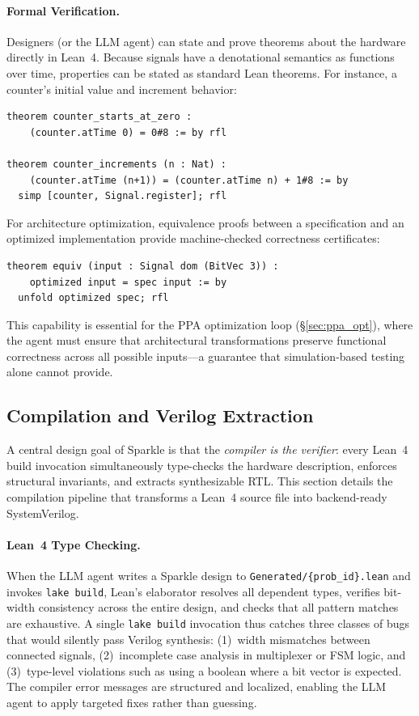 \paragraph{Formal Verification.}
Designers (or the LLM agent) can state and prove theorems about the hardware directly in Lean~4. Because signals have a denotational semantics as functions over time, properties can be stated as standard Lean theorems. For instance, a counter's initial value and increment behavior:
\begin{small}
\begin{verbatim}
theorem counter_starts_at_zero :
    (counter.atTime 0) = 0#8 := by rfl

theorem counter_increments (n : Nat) :
    (counter.atTime (n+1)) = (counter.atTime n) + 1#8 := by
  simp [counter, Signal.register]; rfl
\end{verbatim}
\end{small}
For architecture optimization, equivalence proofs between a specification and an optimized implementation provide machine-checked correctness certificates:
\begin{small}
\begin{verbatim}
theorem equiv (input : Signal dom (BitVec 3)) :
    optimized input = spec input := by
  unfold optimized spec; rfl
\end{verbatim}
\end{small}
This capability is essential for the PPA optimization loop (\S\ref{sec:ppa_opt}), where the agent must ensure that architectural transformations preserve functional correctness across all possible inputs---a guarantee that simulation-based testing alone cannot provide.

\subsection{Compilation and Verilog Extraction}
\label{sec:compilation}

A central design goal of Sparkle is that the \emph{compiler is the verifier}: every Lean~4 build invocation simultaneously type-checks the hardware description, enforces structural invariants, and extracts synthesizable RTL. This section details the compilation pipeline that transforms a Lean~4 source file into backend-ready SystemVerilog.

\paragraph{Lean~4 Type Checking.}
When the LLM agent writes a Sparkle design to \texttt{Generated/\{prob\_id\}.lean} and invokes \texttt{lake build}, Lean's elaborator resolves all dependent types, verifies bit-width consistency across the entire design, and checks that all pattern matches are exhaustive. A single \texttt{lake build} invocation thus catches three classes of bugs that would silently pass Verilog synthesis: (1)~width mismatches between connected signals, (2)~incomplete case analysis in multiplexer or FSM logic, and (3)~type-level violations such as using a boolean where a bit vector is expected. The compiler error messages are structured and localized, enabling the LLM agent to apply targeted fixes rather than guessing.

